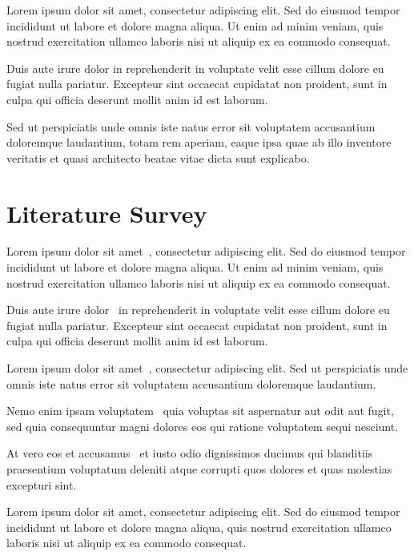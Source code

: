 \documentclass[12pt,a4paper]{report}
\begin{document}
Lorem ipsum dolor sit amet, consectetur adipiscing elit. Sed do eiusmod tempor incididunt ut labore et dolore magna aliqua. Ut enim ad minim veniam, quis nostrud exercitation ullamco laboris nisi ut aliquip ex ea commodo consequat.

Duis aute irure dolor in reprehenderit in voluptate velit esse cillum dolore eu fugiat nulla pariatur. Excepteur sint occaecat cupidatat non proident, sunt in culpa qui officia deserunt mollit anim id est laborum.

Sed ut perspiciatis unde omnis iste natus error sit voluptatem accusantium doloremque laudantium, totam rem aperiam, eaque ipsa quae ab illo inventore veritatis et quasi architecto beatae vitae dicta sunt explicabo.

\chapter{Literature Survey}

Lorem ipsum dolor sit amet~\cite{ref1}, consectetur adipiscing elit. Sed do eiusmod tempor incididunt ut labore et dolore magna aliqua. Ut enim ad minim veniam, quis nostrud exercitation ullamco laboris nisi ut aliquip ex ea commodo consequat.

Duis aute irure dolor~\cite{ref2} in reprehenderit in voluptate velit esse cillum dolore eu fugiat nulla pariatur. Excepteur sint occaecat cupidatat non proident, sunt in culpa qui officia deserunt mollit anim id est laborum.

Lorem ipsum dolor sit amet~\cite{ref3}, consectetur adipiscing elit. Sed ut perspiciatis unde omnis iste natus error sit voluptatem accusantium doloremque laudantium.

Nemo enim ipsam voluptatem~\cite{ref4} quia voluptas sit aspernatur aut odit aut fugit, sed quia consequuntur magni dolores eos qui ratione voluptatem sequi nesciunt.

At vero eos et accusamus~\cite{ref5} et iusto odio dignissimos ducimus qui blanditiis praesentium voluptatum deleniti atque corrupti quos dolores et quas molestias excepturi sint.

Lorem ipsum dolor sit amet, consectetur adipiscing elit. Sed do eiusmod tempor incididunt ut labore et dolore magna aliqua, quis nostrud exercitation ullamco laboris nisi ut aliquip ex ea commodo consequat.
\end{document}
